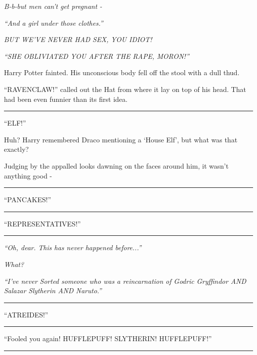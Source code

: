 \emph{B-b-but men can't get pregnant -}

\emph{``And a girl under those clothes.''}

\emph{BUT WE'VE NEVER HAD SEX, YOU IDIOT!}

\emph{``SHE OBLIVIATED YOU AFTER THE RAPE, MORON!''}

Harry Potter fainted. His unconscious body fell off the stool with a
dull thud.

``RAVENCLAW!'' called out the Hat from where it lay on top of his head.
That had been even funnier than its first idea.

\begin{center}\rule{3in}{0.4pt}\end{center}

``ELF!''

Huh? Harry remembered Draco mentioning a `House Elf', but what was that
exactly?

Judging by the appalled looks dawning on the faces around him, it wasn't
anything good -

\begin{center}\rule{3in}{0.4pt}\end{center}

``PANCAKES!''

\begin{center}\rule{3in}{0.4pt}\end{center}

``REPRESENTATIVES!''

\begin{center}\rule{3in}{0.4pt}\end{center}

\emph{``Oh, dear. This has never happened before...''}

\emph{What?}

\emph{``I've never Sorted someone who was a reincarnation of Godric
Gryffindor AND Salazar Slytherin AND Naruto.''}

\begin{center}\rule{3in}{0.4pt}\end{center}

``ATREIDES!''

\begin{center}\rule{3in}{0.4pt}\end{center}

``Fooled you again! HUFFLEPUFF! SLYTHERIN! HUFFLEPUFF!''

\begin{center}\rule{3in}{0.4pt}\end{center}


